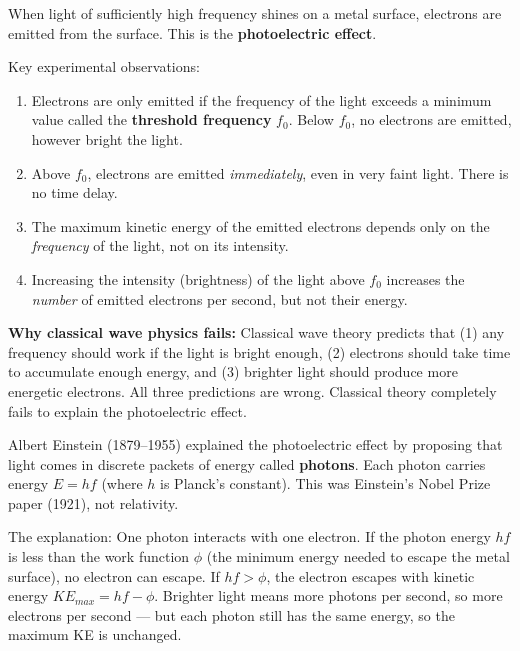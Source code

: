 \begin{processbox}
When light of sufficiently high frequency shines on a
metal surface, electrons are emitted from the surface.
This is the \textbf{photoelectric effect}.

Key experimental observations:
\begin{enumerate}[noitemsep]
  \item Electrons are only emitted if the frequency of
  the light exceeds a minimum value called the
  \textbf{threshold frequency} $f_0$. Below $f_0$,
  no electrons are emitted, however bright the light.
  \item Above $f_0$, electrons are emitted
  \textit{immediately}, even in very faint light. There
  is no time delay.
  \item The maximum kinetic energy of the emitted
  electrons depends only on the \textit{frequency}
  of the light, not on its intensity.
  \item Increasing the intensity (brightness) of the
  light above $f_0$ increases the \textit{number} of
  emitted electrons per second, but not their energy.
\end{enumerate}

\textbf{Why classical wave physics fails:}
Classical wave theory predicts that (1) any frequency
should work if the light is bright enough, (2) electrons
should take time to accumulate enough energy, and (3)
brighter light should produce more energetic electrons.
All three predictions are wrong. Classical theory
completely fails to explain the photoelectric effect.
\end{processbox}

\begin{historybox}
Albert Einstein (1879--1955) explained the photoelectric
effect by proposing that light comes in discrete packets
of energy called \textbf{photons}. Each photon carries
energy $E = hf$ (where $h$ is Planck's constant). This
was Einstein's Nobel Prize paper (1921), not relativity.

The explanation: One photon interacts with one electron.
If the photon energy $hf$ is less than the work
function $\phi$ (the minimum energy needed to escape the
metal surface), no electron can escape. If $hf > \phi$,
the electron escapes with kinetic energy
$KE_{max} = hf - \phi$. Brighter light means more
photons per second, so more electrons per second --- but
each photon still has the same energy, so the maximum
KE is unchanged.
\end{historybox}

